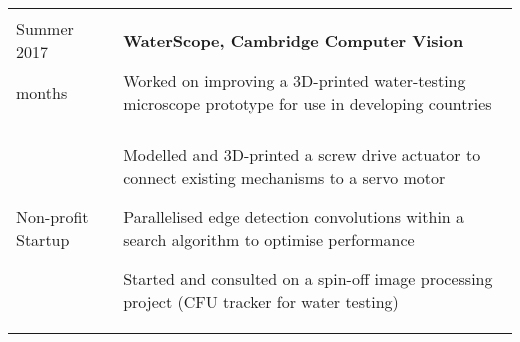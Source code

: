 \documentclass[letterpaper, 10pt]{article}
\begin{document}
\begin{tabularx}{\linewidth}{>{\raggedleft}p{2.2cm}|X}
\begin{compact}
	\vspace{-.5\baselineskip}
\end{compact}\\
Summer 2017 & \textbf{WaterScope, Cambridge \hfill Computer Vision}\\
2 months & Worked on improving a 3D-printed water-testing microscope prototype for use in developing countries\\
\textit{\\Non-profit Startup} &
\vspace{-.5\baselineskip}
\begin{compact}
	\item Modelled and 3D-printed a screw drive actuator to connect existing mechanisms to a servo motor
	\item Parallelised edge detection convolutions within a search algorithm to optimise performance
    \item Started and consulted on a spin-off image processing project (CFU tracker for water testing)
	\vspace{-\baselineskip}
\end{compact}
\end{tabularx}


\end{document}
